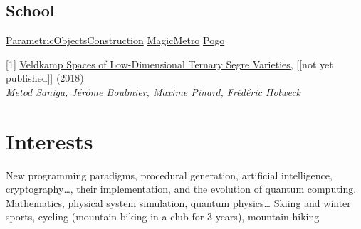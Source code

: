 \documentclass[10pt,a4paper,sans]{moderncv}
\begin{document}
		\subsection{School}
				{\href{https://github.com/pinam45/UTBM\_IN55\_ParametricObjectsConstruction}{ParametricObjectsConstruction}}
				{\href{https://github.com/TiWinDeTea/MagicMetro}{MagicMetro}}
				{\href{https://github.com/pinam45/UTBM_IA41_Pogo}{Pogo}}


	\vspace*{\deletedSpace}
	\begin{thebibliography}{}
		[1] \href{https://arxiv.org/abs/1806.08965}{Veldkamp Spaces of Low-Dimensional Ternary Segre Varieties}, [[not yet published]] (2018)\\
		\textit{Metod Saniga, Jérôme Boulmier, Maxime Pinard, Frédéric Holweck}
	\end{thebibliography}


	\vspace*{\deletedSpace}
	\section{Interests}
			{New programming paradigms, procedural generation, artificial intelligence, cryptography\ldots, their implementation, and the evolution of quantum computing.}
			{Mathematics, physical system simulation, quantum physics\ldots}
			{Skiing and winter sports, cycling (mountain biking in a club for 3 years), mountain hiking}
\end{document}
